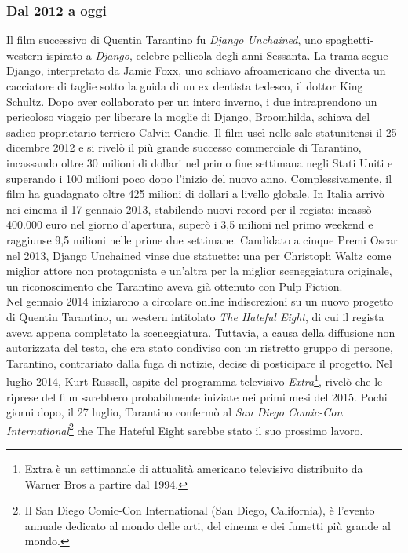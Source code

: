 \documentclass[12pt]{article} %
\begin{document}
\subsubsection{Dal 2012 a oggi}
\begin{flushleft}
Il film successivo di Quentin Tarantino fu \textit{Django Unchained}, uno spaghetti-western ispirato a \textit{Django}, celebre pellicola degli anni Sessanta. La trama segue Django, interpretato da Jamie Foxx, uno schiavo afroamericano che diventa un cacciatore di taglie sotto la guida di un ex dentista tedesco, il dottor King Schultz. Dopo aver collaborato per un intero inverno, i due intraprendono un pericoloso viaggio per liberare la moglie di Django, Broomhilda, 
schiava del sadico proprietario terriero Calvin Candie.
Il film uscì nelle sale statunitensi il 25 dicembre 2012 e si rivelò il più grande successo commerciale di Tarantino, incassando oltre 30 milioni di dollari nel primo fine settimana negli Stati Uniti e superando i 100 milioni poco dopo l'inizio del nuovo anno. Complessivamente, il film ha guadagnato oltre 425 milioni di dollari a livello globale. In Italia arrivò nei cinema il 17 gennaio 2013, stabilendo nuovi record per il regista: incassò 400.000 euro nel giorno d'apertura, superò i 3,5 milioni nel primo weekend e raggiunse 9,5 milioni nelle prime due settimane.
Candidato a cinque Premi Oscar nel 2013, Django Unchained vinse due statuette: una per Christoph Waltz come miglior attore non protagonista e un'altra per la miglior sceneggiatura originale, un riconoscimento che Tarantino aveva già ottenuto con Pulp Fiction.\\\vspace{1cm}
Nel gennaio 2014 iniziarono a circolare online indiscrezioni su un nuovo progetto di Quentin Tarantino, un western intitolato \textit{The Hateful Eight}, di cui il regista aveva appena completato la sceneggiatura. Tuttavia, a causa della diffusione non autorizzata del testo, che era stato condiviso con un ristretto gruppo di persone, Tarantino, contrariato dalla fuga di notizie, decise di posticipare il progetto.
Nel luglio 2014, Kurt Russell, ospite del programma televisivo \textit{Extra}\footnote{Extra è un settimanale di attualità americano televisivo distribuito da Warner Bros a partire dal 1994.}, rivelò che le riprese del film sarebbero probabilmente iniziate nei primi mesi del 2015. 
Pochi giorni dopo, il 27 luglio, Tarantino confermò al \textit{San Diego Comic-Con International}\footnote{Il San Diego Comic-Con International (San Diego, California), è l'evento annuale dedicato al mondo delle arti, del cinema e dei fumetti più grande al mondo.} che The Hateful Eight sarebbe stato il suo prossimo lavoro.

\end{flushleft}
\end{document}
